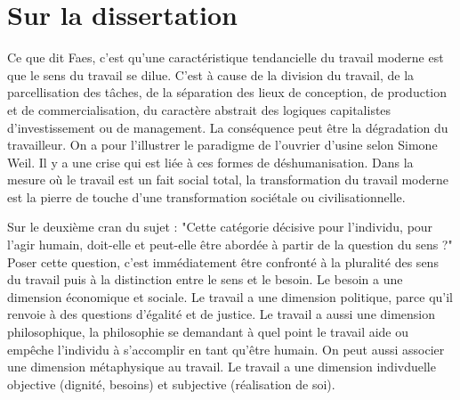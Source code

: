 \documentclass[a4paper,12pt]{book}
\begin{document}
\section{Sur la dissertation}
Ce que dit Faes, c'est qu'une caractéristique tendancielle du travail moderne est que le sens du travail se dilue. C'est à cause de la division du travail, de la parcellisation des tâches, de la séparation des lieux de conception, de production et de commercialisation, du caractère abstrait des logiques capitalistes d'investissement ou de management. La conséquence peut être la dégradation du travailleur. On a pour l'illustrer le paradigme de l'ouvrier d'usine selon Simone Weil. Il y a une crise qui est liée à ces formes de déshumanisation. Dans la mesure où le travail est un fait social total, la transformation du travail moderne est la pierre de touche d'une transformation sociétale ou civilisationnelle.
\par Sur le deuxième cran du sujet : "Cette catégorie décisive pour l'individu, pour l'agir humain, doit-elle et peut-elle être abordée à partir de la question du sens ?" Poser cette question, c'est immédiatement être confronté à la pluralité des sens du travail puis à la distinction entre le sens et le besoin. Le besoin a une dimension économique et sociale. Le travail a une dimension politique, parce qu'il renvoie à des questions d'égalité et de justice. Le travail a aussi une dimension philosophique, la philosophie se demandant à quel point le travail aide ou empêche l'individu à s'accomplir en tant qu'être humain. On peut aussi associer une dimension métaphysique au travail. Le travail a une dimension indivduelle objective (dignité, besoins) et subjective (réalisation de soi).
\end{document}
